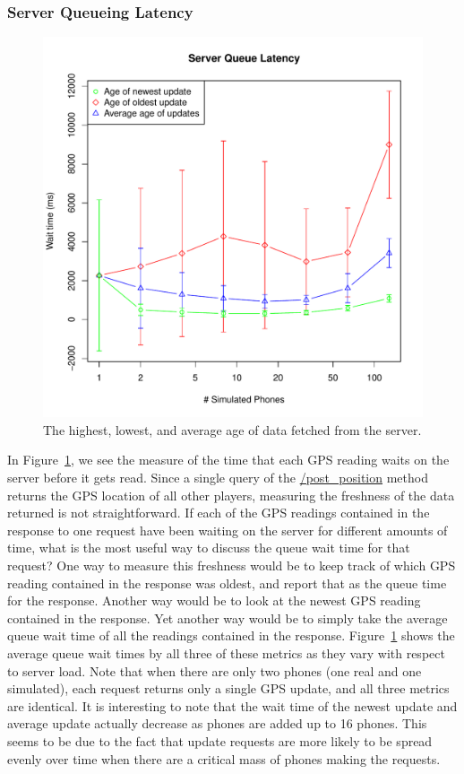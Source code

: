 \documentclass{acm_proc_article-sp}
\begin{document}
\subsubsection{Server Queueing Latency}
\begin{figure}
\centering
\includegraphics[scale=0.6]{figs/serverQueueLatency}
\caption{The highest, lowest, and average age of data fetched from the server.}
\label{fig:serverQueueLatency}
\end{figure}

In Figure~\ref{fig:serverQueueLatency}, we see the measure of the time that each GPS reading waits on the server before it gets read.  Since a single query of the \url{/post_position} method returns the GPS location of all other players, measuring the freshness of the data returned is not straightforward. If each of the GPS readings contained in the response to one request have been waiting on the server for different amounts of time, what is the most useful way to discuss the queue wait time for that request?
One way to measure this freshness would be to keep track of which GPS reading contained in the response was oldest, and report that as the queue time for the response. Another way would be to look at the newest GPS reading contained in the response. Yet another way would be to simply take the average queue wait time of all the readings contained in the response.
Figure~\ref{fig:serverQueueLatency} shows the average queue wait times by all three of these metrics as they vary with respect to server load.
Note that when there are only two phones (one real and one simulated), each request returns only a single GPS update, and all three metrics are identical.
It is interesting to note that the wait time of the newest update and average update actually decrease as phones are added up to 16 phones. This seems to be due to the fact that update requests are more likely to be spread evenly over time when there are a critical mass of phones making the requests.
\end{document}
